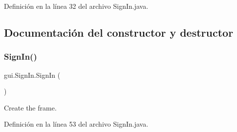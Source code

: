 Definición en la línea 32 del archivo Sign\+In.\+java.



\subsection{Documentación del constructor y destructor}
\mbox{\label{classgui_1_1_sign_in_a565fd1826fd08016ac37adcc6b8285c4}} 
\subsubsection{\texorpdfstring{SignIn()}{SignIn()}}
{\footnotesize\ttfamily gui.\+Sign\+In.\+Sign\+In (\begin{DoxyParamCaption}{ }\end{DoxyParamCaption})}



Create the frame. 



Definición en la línea 53 del archivo Sign\+In.\+java.


